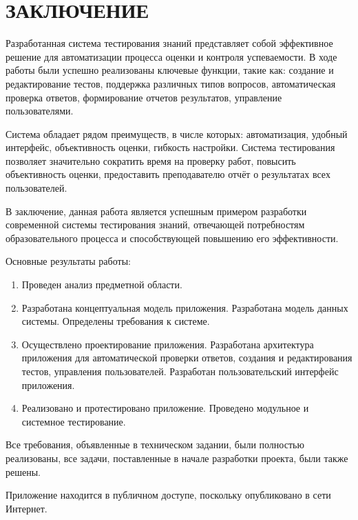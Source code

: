 \section*{ЗАКЛЮЧЕНИЕ}

Разработанная система тестирования знаний представляет собой эффективное решение для автоматизации процесса оценки и контроля успеваемости. В ходе работы были успешно реализованы ключевые функции, такие как: создание и редактирование тестов, поддержка различных типов вопросов, автоматическая проверка ответов, формирование отчетов результатов, управление пользователями.

Система обладает рядом преимуществ, в числе которых: автоматизация, удобный интерфейс, объективность оценки, гибкость настройки. Система тестирования позволяет значительно сократить время на проверку работ, повысить объективность оценки, предоставить преподавателю отчёт о результатах всех пользователей.

В заключение, данная работа является успешным примером разработки современной системы тестирования знаний, отвечающей потребностям образовательного процесса и способствующей повышению его эффективности.

Основные результаты работы:

\begin{enumerate}
\item Проведен анализ предметной области.
\item Разработана концептуальная модель приложения. Разработана модель данных системы. Определены требования к системе.
\item Осуществлено проектирование приложения. Разработана архитектура приложения для автоматической проверки ответов, создания и редактирования тестов, управления пользователей. Разработан пользовательский интерфейс приложения.
\item Реализовано и протестировано приложение. Проведено модульное и системное тестирование.
\end{enumerate}

Все требования, объявленные в техническом задании, были полностью реализованы, все задачи, поставленные в начале разработки проекта, были также решены.

Приложение находится в публичном доступе, поскольку опубликовано в сети Интернет.  
